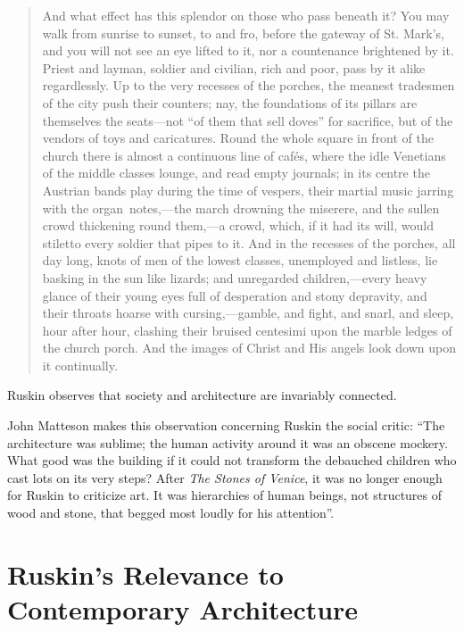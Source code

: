 \begin{quote}
And what effect has this splendor on those who pass beneath it?  You may
walk from sunrise to sunset, to and fro, before the gateway of St.
Mark’s, and you will not see an eye lifted to it, nor a countenance
brightened by it.  Priest and layman, soldier and civilian, rich and
poor, pass by it alike regardlessly.  Up to the very recesses of the
porches, the meanest tradesmen of the city push their counters; nay,
the foundations of its pillars are themselves the seats—not “of them
that sell doves” for sacrifice, but of the vendors of toys and
caricatures.  Round the whole square in front of the church there is
almost a continuous line of cafés, where the idle Venetians of the
middle classes lounge, and read empty journals; in its centre the
Austrian bands play during the time of vespers, their martial music
jarring with the organ~notes,—the march drowning the miserere, and the
sullen crowd thickening round them,—a crowd, which, if it had its will,
would stiletto every soldier that pipes to it.  And in the recesses of
the porches, all day long, knots of men of the lowest classes,
unemployed and listless, lie basking in the sun like lizards; and
unregarded children,—every heavy glance of their young eyes full of
desperation and stony depravity, and their throats hoarse with
cursing,—gamble, and fight, and snarl, and sleep, hour after hour,
clashing their bruised centesimi upon the marble ledges of the church
porch.  And the images of Christ and His angels look down upon it
continually. \citep[][vol. 2, ch. 4, sec. 15]{ruskin1885}
\end{quote}

Ruskin observes that society and architecture are invariably connected.

John Matteson makes this observation concerning Ruskin the social
critic: ``The architecture was sublime; the human activity
around it was an obscene mockery.  What good was the building if it
could not transform the debauched children who cast lots on its very
steps?  After \textit{The Stones of Venice}, it was no longer enough
for Ruskin to criticize art.  It was hierarchies of human beings, not
structures of wood and stone, that begged most loudly for his
attention''\citep[][pg. 302]{matteson2002}.

\section{Ruskin's Relevance to Contemporary Architecture}

